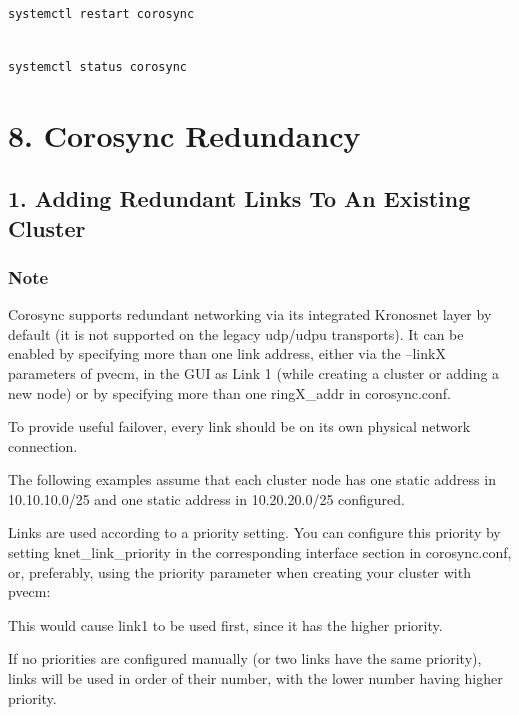 \begin{lstlisting}

systemctl restart corosync

\end{lstlisting}

\begin{lstlisting}

systemctl status corosync

\end{lstlisting}


\section{8. Corosync Redundancy}

\subsection{1. Adding Redundant Links To An Existing Cluster}

\subsubsection{Note}

Corosync supports redundant networking via its integrated Kronosnet layer by default (it is not supported on the legacy udp/udpu transports). It can be enabled by specifying more than one link address, either via the --linkX parameters of pvecm, in the GUI as Link 1 (while creating a cluster or adding a new node) or by specifying more than one ringX_addr in corosync.conf.

To provide useful failover, every link should be on its own physical network connection.

The following examples assume that each cluster node has one static address in 10.10.10.0/25 and one static address in 10.20.20.0/25 configured.

Links are used according to a priority setting. You can configure this priority by setting knet_link_priority in the corresponding interface section in corosync.conf, or, preferably, using the priority parameter when creating your cluster with pvecm:

This would cause link1 to be used first, since it has the higher priority.

If no priorities are configured manually (or two links have the same priority), links will be used in order of their number, with the lower number having higher priority.

